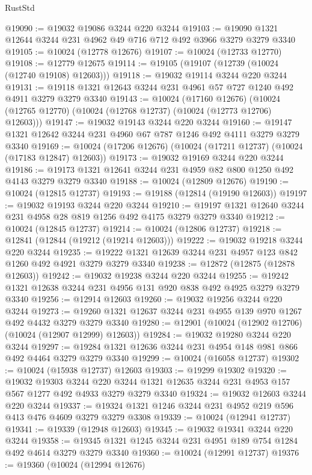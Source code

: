 \begin{lexlean}{RustStd}
\begin{coremodule}
@19090 := @19032 @19086 @3244 @220 @3244
@19103 := @19090 @1321 @12644 @3244 @231 @4962 @49 @716 @712 @492 @3966 @3279 @3279 @3340
@19105 := @10024 (@12778 @12676)
@19107 := @10024 (@12733 @12770)
@19108 := @12779 @12675
@19114 := @19105 (@19107 (@12739 (@10024 (@12740 @19108) @12603)))
@19118 := @19032 @19114 @3244 @220 @3244
@19131 := @19118 @1321 @12643 @3244 @231 @4961 @57 @727 @1240 @492 @4911 @3279 @3279 @3340
@19143 := @10024
    (@17160 @12676)
    (@10024 (@12765 @12770) (@10024 (@12768 @12737) (@10024 (@12773 @12706) @12603)))
@19147 := @19032 @19143 @3244 @220 @3244
@19160 := @19147 @1321 @12642 @3244 @231 @4960 @67 @787 @1246 @492 @4111 @3279 @3279 @3340
@19169 := @10024 (@17206 @12676) (@10024 (@17211 @12737) (@10024 (@17183 @12847) @12603))
@19173 := @19032 @19169 @3244 @220 @3244
@19186 := @19173 @1321 @12641 @3244 @231 @4959 @82 @800 @1250 @492 @4143 @3279 @3279 @3340
@19188 := @10024 (@12809 @12676)
@19190 := @10024 (@12815 @12737)
@19193 := @19188 (@12814 (@19190 @12603))
@19197 := @19032 @19193 @3244 @220 @3244
@19210 := @19197 @1321 @12640 @3244 @231 @4958 @28 @819 @1256 @492 @4175 @3279 @3279 @3340
@19212 := @10024 (@12845 @12737)
@19214 := @10024 (@12806 @12737)
@19218 := @12841 (@12844 (@19212 (@19214 @12603)))
@19222 := @19032 @19218 @3244 @220 @3244
@19235 := @19222 @1321 @12639 @3244 @231 @4957 @123 @842 @1260 @492 @4921 @3279 @3279 @3340
@19238 := @12872 (@12875 (@12878 @12603))
@19242 := @19032 @19238 @3244 @220 @3244
@19255 := @19242 @1321 @12638 @3244 @231 @4956 @131 @920 @838 @492 @4925 @3279 @3279 @3340
@19256 := @12914 @12603
@19260 := @19032 @19256 @3244 @220 @3244
@19273 := @19260 @1321 @12637 @3244 @231 @4955 @139 @970 @1267 @492 @4432 @3279 @3279 @3340
@19280 := @12901 (@10024 (@12902 @12706) (@10024 (@12907 @12999) @12603))
@19284 := @19032 @19280 @3244 @220 @3244
@19297 := @19284 @1321 @12636 @3244 @231 @4954 @148 @981 @866 @492 @4464 @3279 @3279 @3340
@19299 := @10024 (@16058 @12737)
@19302 := @10024 (@15938 @12737) @12603
@19303 := @19299 @19302
@19320 := @19032
    @19303
    @3244
    @220
    @3244
    @1321
    @12635
    @3244
    @231
    @4953
    @157
    @567
    @1277
    @492
    @4933
    @3279
    @3279
    @3340
@19324 := @19032 @12603 @3244 @220 @3244
@19337 := @19324 @1321 @1246 @3244 @231 @4952 @219 @596 @413 @476 @4609 @3279 @3279 @3308
@19339 := @10024 (@12941 @12737)
@19341 := @19339 (@12948 @12603)
@19345 := @19032 @19341 @3244 @220 @3244
@19358 := @19345 @1321 @1245 @3244 @231 @4951 @189 @754 @1284 @492 @4614 @3279 @3279 @3340
@19360 := @10024 (@12991 @12737)
@19376 := @19360
    (@10024
      (@12994 @12676)

\end{coremodule}
\end{lexlean}
